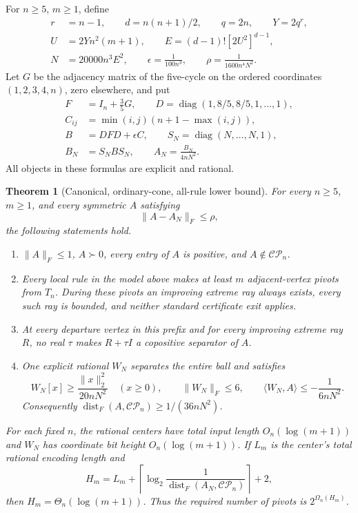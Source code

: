 \documentclass[11pt]{article}
\newtheorem{theorem}{Theorem}[section]
\theoremstyle{remark}\newtheorem{remark}[theorem]{Remark}
\newcommand{\CP}{\mathcal{CP}}\newcommand{\COP}{\mathcal{COP}}
\newcommand{\diag}{\operatorname{diag}}\newcommand{\cone}{\operatorname{cone}}
\newcommand{\ip}[2]{\langle #1,#2\rangle}\newcommand{\trans}{^{\mathsf T}}
\newcommand{\norm}[1]{\lVert #1\rVert}
\begin{document}
For $n\ge5$, $m\ge1$, define
\begin{equation}\label{eq:params}
 \begin{split}
 r&=n-1,\qquad d=n(n+1)/2,\qquad q=2n,\qquad Y=2q^r,\\
 U&=2Yn^2(m+1),\qquad E=(d-1)![2U^2]^{d-1},\\
 N&=20000n^3E^2,\qquad \epsilon=\frac1{100n^3},\qquad
 \rho=\frac1{1600n^4N^2}.
 \end{split}
\end{equation}
Let $G$ be the adjacency matrix of the five-cycle on the ordered coordinates $(1,2,3,4,n)$, zero elsewhere, and put
\begin{equation}\label{eq:targets}
 \begin{split}
 F&=I_n+\frac35G,\qquad D=\diag(1,8/5,8/5,1,\ldots,1),\\
 C_{ij}&=\min(i,j)(n+1-\max(i,j)),\\
 B&=DFD+\epsilon C,\qquad S_N=\diag(N,\ldots,N,1),\\
 B_N&=S_NBS_N,\qquad A_N=\frac{B_N}{4nN^2}.
 \end{split}
\end{equation}
All objects in these formulas are explicit and rational.

\begin{theorem}[Canonical, ordinary-cone, all-rule lower bound]\label{thm:main}
For every $n\ge5$, $m\ge1$, and every symmetric $A$ satisfying
\begin{equation}\label{eq:ball}\norm{A-A_N}_F\le\rho,
\end{equation}
the following statements hold.
\begin{enumerate}
\item $\norm A_F\le1$, $A\succ0$, every entry of $A$ is positive, and $A\notin\CP_n$.
\item Every local rule in the model above makes at least $m$ adjacent-vertex pivots from $T_n$. During these pivots an improving extreme ray always exists, every such ray is bounded, and neither standard certificate exit applies.
\item At every departure vertex in this prefix and for every improving extreme ray $R$, no real $\tau$ makes $R+\tau I$ a copositive separator of $A$.
\item One explicit rational $W_N$ separates the entire ball and satisfies
\[
 W_N[x]\ge\frac{\norm x_2^2}{20nN^2}\quad(x\ge0),\qquad
 \norm{W_N}_F\le6,\qquad
 \ip{W_N}A\le-\frac1{6nN^2}.
\]
Consequently $\operatorname{dist}_F(A,\CP_n)\ge1/(36nN^2)$.
\end{enumerate}
For each fixed $n$, the rational centers have total input length $O_n(\log(m+1))$ and $W_N$ has coordinate bit height $O_n(\log(m+1))$. If $L_m$ is the center's total rational encoding length and
\[
 H_m=L_m+\left\lceil\log_2\frac1{\operatorname{dist}_F(A_N,\CP_n)}\right\rceil+2,
\]
then $H_m=\Theta_n(\log(m+1))$. Thus the required number of pivots is $2^{\Omega_n(H_m)}$.
\end{theorem}
\end{document}
